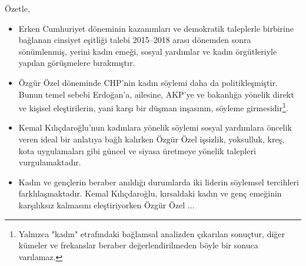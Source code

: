 Özetle, 
\vspace{-1.2em}
\begin{itemize}
    \item Erken Cumhuriyet döneminin kazanımları ve demokratik taleplerle birbirine bağlanan cinsiyet eşitliği talebi 2015--2018 arası dönemden sonra sönümlenmiş,
    yerini kadın emeği, sosyal yardımlar ve kadın örgütleriyle yapılan görüşmelere bırakmıştır.
    \item Özgür Özel döneminde CHP'nin kadın söylemi daha da politikleşmiştir. Bunun temel sebebi Erdoğan'a, ailesine, AKP'ye ve bakanlığa yönelik direkt ve 
    kişisel eleştirilerin, yani karşı bir düşman inşasının, söyleme girmesidir\footnote{Yalnızca "kadın" etrafındaki bağlamsal analizden çıkarılan sonuçtur, diğer kümeler ve frekanslar beraber değerlendirilmeden böyle bir sonuca varılamaz.}. 
    \item Kemal Kılıçdaroğlu'nun kadınlara yönelik söylemi sosyal yardımlara öncelik veren ideal bir anlatıya bağlı kalırken
    Özgür Özel işsizlik, yoksulluk, kreş, kota uygulamaları gibi güncel ve siyasa üretmeye yönelik talepleri vurgulamaktadır.
    \item Kadın ve gençlerin beraber anıldığı durumlarda iki liderin söylemsel tercihleri farklılaşmaktadır. Kemal Kılıçdaroğlu, kırsaldaki
    kadın ve genç emeğinin karşılıksız kalmasını eleştiriyorken Özgür Özel ...
    
\end{itemize}
